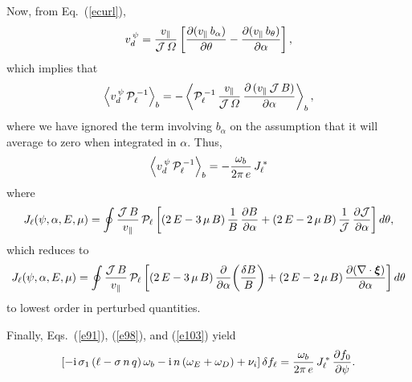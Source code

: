 \documentclass[12pt,prb,aps,notitlepage]{revtex4-1}
\newcommand{\bxi}{\mbox{\boldmath$\xi$}}
\begin{document}
 Now, from Eq.~(\ref{ecurl}), 
 \begin{equation}\label{e101}
 v_d^{\,\psi}= \frac{v_\parallel}{{\cal J}\,{\mit\Omega}}\left[\frac{\partial (v_\parallel\,b_\alpha)}{\partial\theta} - \frac{\partial (v_\parallel\,b_\theta)}{\partial \alpha}\right],
 \end{equation}
 which implies that 
 \begin{equation}
 \left\langle v_d^{\,\psi}\,{\cal P}_{\ell}^{\,-1}\right\rangle_b = -\left\langle{\cal P}_{\ell}^{\,-1}\, \frac{v_\parallel}{{\cal J}\,{\mit\Omega}}\,\frac{\partial \,(v_\parallel\,{\cal J}\,B)}{\partial\alpha}\right\rangle_b,
 \end{equation}
 where we have ignored the term involving $b_\alpha$ on the assumption that it will average to zero when integrated in $\alpha$. 
 Thus,
 \begin{equation}\label{e103}
 \left\langle v_d^{\,\psi}\,{\cal P}_{\ell}^{\,-1}\right\rangle_b =-\frac{\omega_b}{2\pi\,e}\,J_{\ell}^{\,\ast}
 \end{equation}
 where
 \begin{equation}
 J_\ell(\psi,\alpha,E,\mu)= \oint
 \frac{{\cal J}\,B}{v_\parallel}\,{\cal P}_{\ell}
 \left[(2\,E-3\,\mu\,B)\,\frac{1}{B}\,\frac{\partial B}{\partial \alpha} + (2\,E-2\,\mu\,B)\,\frac{1}{{\cal J}}\,\frac{\partial
 {\cal J}}{\partial\alpha}\right]d\theta,
 \end{equation}
 which reduces to 
 \begin{equation}\label{e126}
 J_\ell(\psi,\alpha,E,\mu)= \oint 
 \frac{{\cal J}\,B}{v_\parallel}\,{\cal P}_{\ell}
 \left[(2\,E-3\,\mu\,B)\,\frac{\partial }{\partial \alpha} \!\left(\frac{\delta B}{B}\right)+ (2\,E-2\,\mu\,B)\,\frac{\partial
(\nabla\cdot\bxi)}{\partial\alpha}\right]d\theta
 \end{equation}
 to lowest order in perturbed quantities. 
 
 Finally, Eqs.~(\ref{e91}), (\ref{e98}), and (\ref{e103}) yield
 \begin{equation}\label{e128}
 \left[-{\rm i}\,\sigma_1\,(\ell - \sigma\,n\,q)\,\omega_b -{\rm i}\,n\,(\omega_E+\omega_D) + \nu_i\right]\delta f_\ell = \frac{\omega_b}{2\pi\,e}\,J_\ell^{\,\ast}\,\frac{\partial f_0}{\partial \psi}.
 \end{equation}
 
\end{document}
